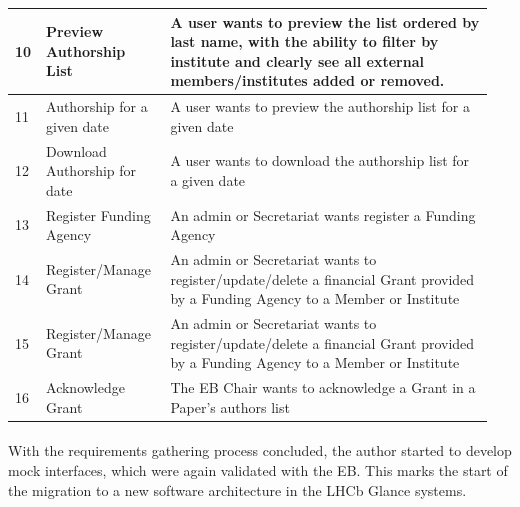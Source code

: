 \begin{longtable}{|p{0.05\linewidth}|p{0.25\linewidth}|p{0.65\linewidth}|}
\hline
10 & Preview Authorship List & A user wants to preview the list ordered by last name, with the ability to filter by institute and clearly see all external members/institutes added or removed. \\
\hline
11 & Authorship for a given date & A user wants to preview the authorship list for a given date \\
\hline
12 & Download Authorship for date & A user wants to download the authorship list for a given date \\
\hline
13 & Register Funding Agency & An admin or Secretariat wants register a Funding Agency \\
\hline
14 & Register/Manage Grant & An admin or Secretariat wants to register/update/delete a financial Grant provided by a Funding Agency to a Member or Institute \\
\hline
15 & Register/Manage Grant & An admin or Secretariat wants to register/update/delete a financial Grant provided by a Funding Agency to a Member or Institute \\
\hline
16 & Acknowledge Grant & The EB Chair wants to acknowledge a Grant in a Paper's authors list \\

\end{longtable}

\paragraph{} With the requirements gathering process concluded, the author started to develop mock interfaces, which were again validated with the EB. This marks the start of the migration to a new software architecture in the LHCb Glance systems.

